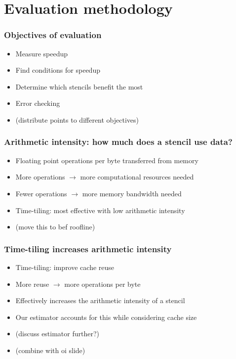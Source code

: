 \documentclass{beamer}
\begin{document}
\section{Evaluation methodology}

\begin{frame}
\frametitle{Objectives of evaluation}

\begin{itemize}
	\item Measure speedup
	\item Find conditions for speedup
	\item Determine which stencils benefit the most
	\item Error checking
	\item (distribute points to different objectives)
\end{itemize}
\end{frame}



\begin{frame}
\frametitle{Arithmetic intensity: how much does a stencil use data?}

\begin{itemize}
	\item Floating point operations per byte transferred from memory
	\item More operations \(\rightarrow\) more computational resources needed
	\item Fewer operations \(\rightarrow\) more memory bandwidth needed
	\item Time-tiling: most effective with low arithmetic intensity
	\item (move this to bef roofline)
\end{itemize}
\end{frame}



\begin{frame}
\frametitle{Time-tiling increases arithmetic intensity}

\begin{itemize}
	\item Time-tiling: improve cache reuse
	\item More reuse \(\rightarrow\) more operations per byte
	\item Effectively increases the arithmetic intensity of a stencil
	\item Our estimator accounts for this while considering cache size
	\item (discuss estimator further?)
	\item (combine with oi slide)
\end{itemize}
\end{frame}
\end{document}
